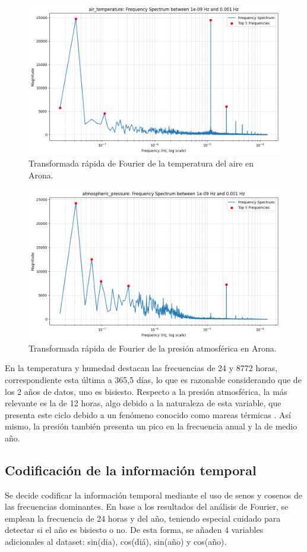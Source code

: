 \begin{figure}
    \centering
    \includegraphics[width=.5\linewidth]{images/fft_temperature.png}
    \caption{Transformada rápida de Fourier de la temperatura del aire en Arona.}
    \label{fft_temperature}
\end{figure}

 \begin{figure}
    \centering
    \includegraphics[width=.5\linewidth]{images/fft_pressure.png}
    \caption{Transformada rápida de Fourier de la presión atmosférica en Arona.}
    \label{fft_pressure}
\end{figure}



En la temperatura y humedad destacan las frecuencias de 24 y 8772 horas, correspondiente esta última a 365,5 días, lo que es razonable considerando que de los 
2 años de datos, uno es bisiesto. Respecto a la presión atmosférica, la más relevante es la de 12 horas, algo debido a la naturaleza de esta variable, 
que presenta este ciclo debido a un fenómeno conocido como mareas térmicas \cite{ChapmanLindzen1970}. Así mismo, la presión también presenta un pico en la frecuencia anual y la de medio año.


\subsection{Codificación de la información temporal}
Se decide codificar la información temporal mediante el uso de senos y cosenos de las frecuencias dominantes.
En base a los resultados del análisis de Fourier, se emplean la frecuencia de 24 horas y del año, teniendo especial cuidado para detectar
    si el año es bisiesto o no. De esta forma, se añaden 4 variables adicionales al dataset: sin(dia), cos(diá), sin(año) y cos(año).


